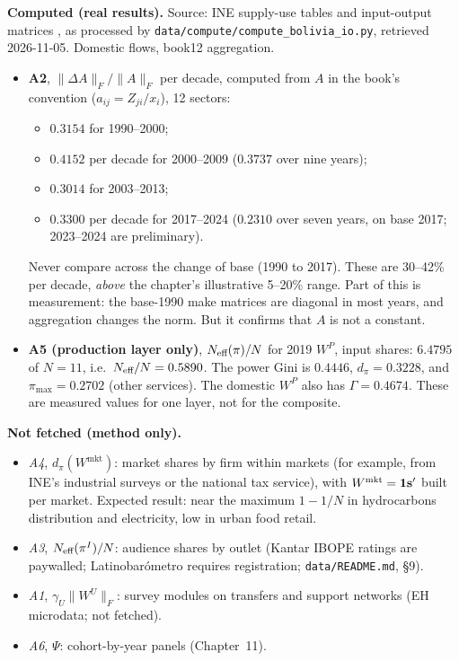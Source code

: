 \documentclass[../solutions_manual.tex]{subfiles}
\begin{document}
\textbf{Computed (real results).} Source: INE supply-use tables and input-output matrices \citep{ine2026sut}, as processed by \texttt{data/compute/compute\_bolivia\_io.py}, retrieved 2026-11-05. Domestic flows, book12 aggregation.
\begin{itemize}
\item \textbf{A2}, $\|\Delta A\|_F/\|A\|_F$ per decade, computed from $A$ in the book's convention ($a_{ij} = Z_{ji}/x_i$), 12 sectors:
\begin{itemize}
\item $0.3154$ for 1990--2000;
\item $0.4152$ per decade for 2000--2009 ($0.3737$ over nine years);
\item $0.3014$ for 2003--2013;
\item $0.3300$ per decade for 2017--2024 ($0.2310$ over seven years, on base 2017; 2023--2024 are preliminary).
\end{itemize}
Never compare across the change of base (1990 to 2017). These are 30--42\% per decade, \emph{above} the chapter's illustrative 5--20\% range. Part of this is measurement: the base-1990 make matrices are diagonal in most years, and aggregation changes the norm. But it confirms that $A$ is not a constant.
\item \textbf{A5 (production layer only)}, $N_{\text{eff}}(\pi)/N$ for 2019 $W^P$, input shares: $6.4795$ of $N = 11$, i.e.\ $N_{\text{eff}}/N = 0.5890$. The power Gini is $0.4446$, $d_\pi = 0.3228$, and $\pi_{\max} = 0.2702$ (other services). The domestic $W^P$ also has $\Gamma = 0.4674$. These are measured values for one layer, not for the composite.
\end{itemize}

\textbf{Not fetched (method only).}
\begin{itemize}
\item \emph{A4}, $d_\pi(W^{\text{mkt}})$: market shares by firm within markets (for example, from INE's industrial surveys or the national tax service), with $W^{\text{mkt}} = \mathbf{1}\mathbf s'$ built per market. Expected result: near the maximum $1 - 1/N$ in hydrocarbons distribution and electricity, low in urban food retail.
\item \emph{A3}, $N_{\text{eff}}(\pi^I)/N$: audience shares by outlet (Kantar IBOPE ratings are paywalled; Latinobar\'ometro requires registration; \texttt{data/README.md}, \S9).
\item \emph{A1}, $\gamma_U\|W^U\|_F$: survey modules on transfers and support networks (EH microdata; not fetched).
\item \emph{A6}, $\Psi$: cohort-by-year panels (Chapter~11).
\end{itemize}
\end{document}
